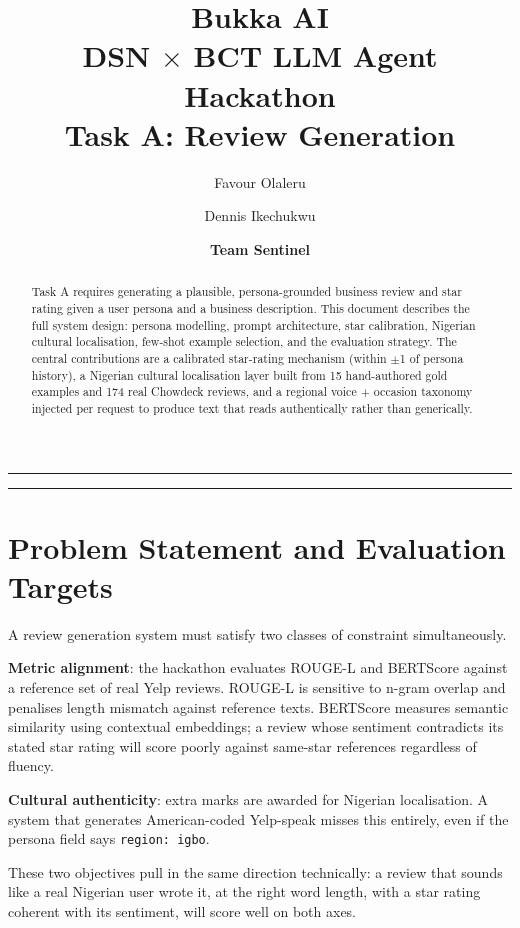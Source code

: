 \documentclass[11pt]{article}
\title{\textbf{Bukka AI} \\ \large DSN $\times$ BCT LLM Agent Hackathon \\ \Large Task A: Review Generation}
\author{Favour Olaleru \and Dennis Ikechukwu}
\date{\textbf{Team Sentinel}}
\begin{document}
\maketitle

\hrule
\vspace{1em}

\begin{abstract}
Task A requires generating a plausible, persona-grounded business review and star rating given a user persona and a business description. This document describes the full system design: persona modelling, prompt architecture, star calibration, Nigerian cultural localisation, few-shot example selection, and the evaluation strategy. The central contributions are a calibrated star-rating mechanism (within $\pm$1 of persona history), a Nigerian cultural localisation layer built from 15 hand-authored gold examples and 174 real Chowdeck reviews, and a regional voice + occasion taxonomy injected per request to produce text that reads authentically rather than generically.
\end{abstract}

\vspace{1em}
\hrule
\vspace{2em}

\section{Problem Statement and Evaluation Targets}

A review generation system must satisfy two classes of constraint simultaneously.

\textbf{Metric alignment}: the hackathon evaluates ROUGE-L and BERTScore against a reference set of real Yelp reviews. ROUGE-L is sensitive to n-gram overlap and penalises length mismatch against reference texts. BERTScore measures semantic similarity using contextual embeddings; a review whose sentiment contradicts its stated star rating will score poorly against same-star references regardless of fluency.

\textbf{Cultural authenticity}: extra marks are awarded for Nigerian localisation. A system that generates American-coded Yelp-speak misses this entirely, even if the persona field says \texttt{region: igbo}.

These two objectives pull in the same direction technically: a review that sounds like a real Nigerian user wrote it, at the right word length, with a star rating coherent with its sentiment, will score well on both axes.
\end{document}
